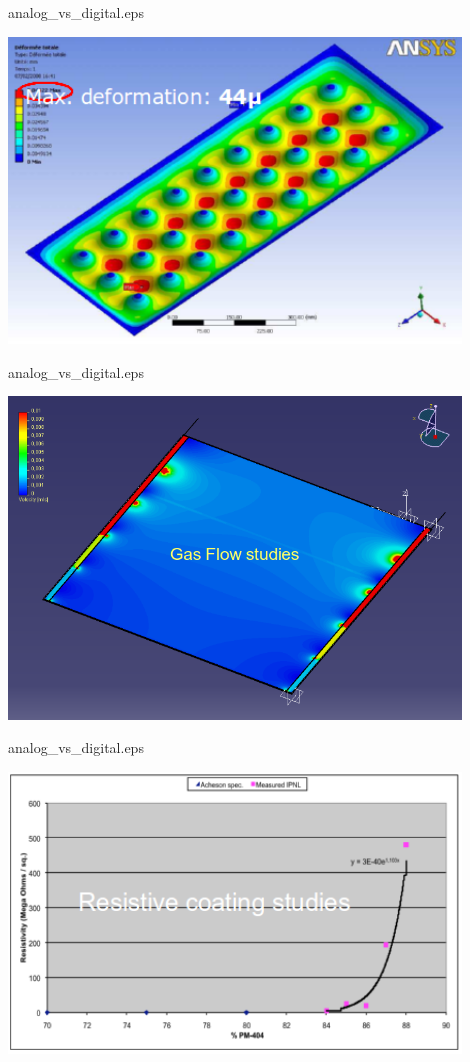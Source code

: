 \begin{frame}{analog\_vs\_digital.eps}
  \centerline{\includegraphics[width=0.9\textwidth]{images/DeformationStudies}}
\end{frame}
\begin{frame}{analog\_vs\_digital.eps}
  \centerline{\includegraphics[width=0.9\textwidth]{images/GasFlow}}
\end{frame}
\begin{frame}{analog\_vs\_digital.eps}
  \centerline{\includegraphics[width=0.9\textwidth]{images/CoatingStudies}}
\end{frame}
